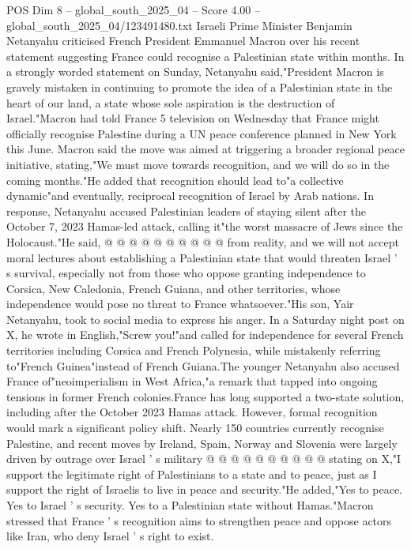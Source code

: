 \begin{textsample}{POS Dim 8 – global\_south\_2025\_04 – Score 4.00 – global\_south\_2025\_04/123491480.txt}  \label{ex:f8_pos_165}
Israeli Prime Minister Benjamin Netanyahu criticised French President Emmanuel Macron over his recent statement suggesting France could recognise a Palestinian state within months.
In a strongly worded statement on Sunday, Netanyahu said,"President Macron is gravely mistaken in continuing to promote the idea of a Palestinian state in the heart of our land, a state whose sole aspiration is the destruction of Israel."Macron had told France 5 television on Wednesday that France might officially recognise Palestine during a UN peace conference planned in New York this June.
Macron said the move was aimed at triggering a broader regional peace initiative, stating,"We must move towards recognition, and we will do so in the coming months."He added that recognition should lead to"a collective dynamic"and eventually, reciprocal recognition of Israel by Arab nations.
In response, Netanyahu accused Palestinian leaders of staying silent after the October 7, 2023 Hamas-led attack, calling it"the worst massacre of Jews since the Holocaust."He said, @ @ @ @ @ @ @ @ @ @ from reality, and we will not accept moral lectures about establishing a Palestinian state that would threaten Israel ' s survival, especially not from those who oppose granting independence to Corsica, New Caledonia, French Guiana, and other territories, whose independence would pose no threat to France whatsoever."His son, Yair Netanyahu, took to social media to express his anger.
In a Saturday night post on X, he wrote in English,"Screw you!"and called for independence for several French territories including Corsica and French Polynesia, while mistakenly referring to"French Guinea"instead of French Guiana.The younger Netanyahu also accused France of"neoimperialism in West Africa,"a remark that tapped into ongoing tensions in former French colonies.France has long supported a two-state solution, including after the October 2023 Hamas attack.
However, formal recognition would mark a significant policy shift.
Nearly 150 countries currently recognise Palestine, and recent moves by Ireland, Spain, Norway and Slovenia were largely driven by outrage over Israel ' s military @ @ @ @ @ @ @ @ @ @ stating on X,"I support the legitimate right of Palestinians to a state and to peace, just as I support the right of Israelis to live in peace and security."He added,"Yes to peace.
Yes to Israel ' s security.
Yes to a Palestinian state without Hamas."Macron stressed that France ' s recognition aims to strengthen peace and oppose actors like Iran, who deny Israel ' s right to exist.

\end{textsample}
